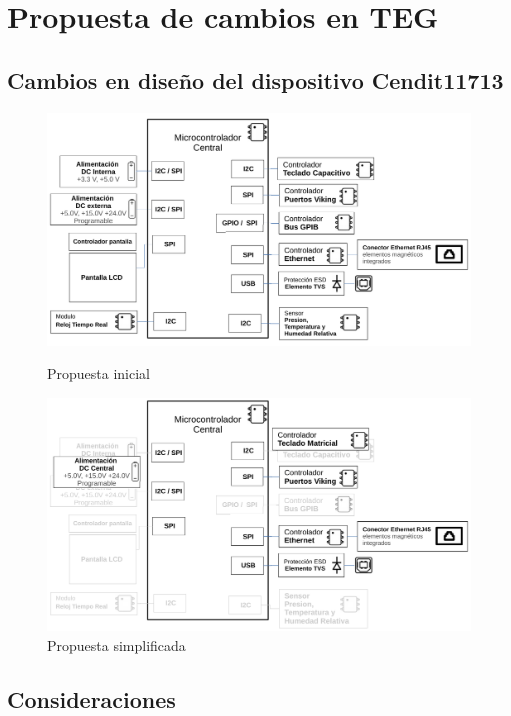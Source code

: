 \documentclass[paper=letter,oneside,fontsize=12pt, parskip=full]{article}
\begin{document}
	
	\section{Propuesta de cambios en TEG}
	
	\subsection{Cambios en diseño del dispositivo Cendit11713}
	
		\begin{figure}[h!] 
			\centering
			\includegraphics[width=16cm]{Cendit11713BloquesAntes.pdf} \\
			\caption{Propuesta inicial}
		\end{figure}

		\begin{figure}[h!]
			\centering
			\includegraphics[width=16cm]{Cendit11713BloquesDespues.pdf}
			\caption{Propuesta simplificada}
		\end{figure}	
	
	\subsection{Consideraciones}
	
\end{document}
